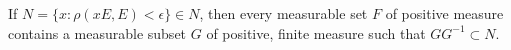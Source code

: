 If $N = \{x : \rho(xE, E) < \epsilon\} \in N$, then every measurable set $F$ of positive measure contains a measurable subset $G$ of positive, finite measure such that $GG^{-1} \subset N$.

